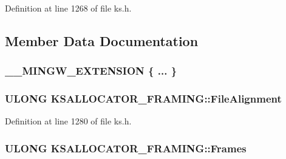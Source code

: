 Definition at line 1268 of file ks.\+h.



\subsection{Member Data Documentation}
\subsubsection[{\texorpdfstring{"@185}{@185}}]{\setlength{\rightskip}{0pt plus 5cm}\+\_\+\+\_\+\+M\+I\+N\+G\+W\+\_\+\+E\+X\+T\+E\+N\+S\+I\+ON \{ ... \} }\hypertarget{struct_k_s_a_l_l_o_c_a_t_o_r___f_r_a_m_i_n_g_ae0bcfe15ad239836a121c4509ff5ca08}{}\label{struct_k_s_a_l_l_o_c_a_t_o_r___f_r_a_m_i_n_g_ae0bcfe15ad239836a121c4509ff5ca08}
\subsubsection[{\texorpdfstring{File\+Alignment}{FileAlignment}}]{\setlength{\rightskip}{0pt plus 5cm}U\+L\+O\+NG K\+S\+A\+L\+L\+O\+C\+A\+T\+O\+R\+\_\+\+F\+R\+A\+M\+I\+N\+G\+::\+File\+Alignment}\hypertarget{struct_k_s_a_l_l_o_c_a_t_o_r___f_r_a_m_i_n_g_ae0f7fcded8d4244e4287f9d90fa9f34c}{}\label{struct_k_s_a_l_l_o_c_a_t_o_r___f_r_a_m_i_n_g_ae0f7fcded8d4244e4287f9d90fa9f34c}


Definition at line 1280 of file ks.\+h.

\subsubsection[{\texorpdfstring{Frames}{Frames}}]{\setlength{\rightskip}{0pt plus 5cm}U\+L\+O\+NG K\+S\+A\+L\+L\+O\+C\+A\+T\+O\+R\+\_\+\+F\+R\+A\+M\+I\+N\+G\+::\+Frames}\hypertarget{struct_k_s_a_l_l_o_c_a_t_o_r___f_r_a_m_i_n_g_aa25e20017444ced6d4d6fe1e4279ffb4}{}\label{struct_k_s_a_l_l_o_c_a_t_o_r___f_r_a_m_i_n_g_aa25e20017444ced6d4d6fe1e4279ffb4}


